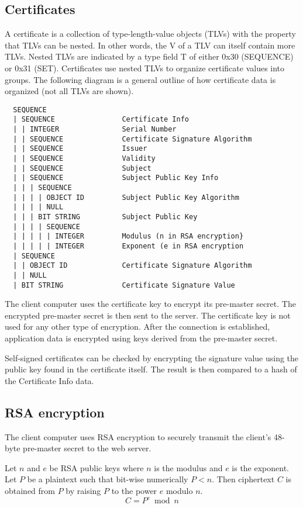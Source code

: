 \documentclass[12pt]{article}
\begin{document}
\subsection*{Certificates}

A certificate is a collection of type-length-value objects (TLVs) with the
property that TLVs can be nested.
In other words, the V of a TLV can itself contain more TLVs.
Nested TLVs are indicated by a type field T of either 0x30 (SEQUENCE)
or 0x31 (SET).
Certificates use nested TLVs to organize certificate values
into groups.
The following diagram is a general outline of how certificate data is organized
(not all TLVs are shown).

{\scriptsize
\begin{verbatim}
  SEQUENCE
  | SEQUENCE                Certificate Info
  | | INTEGER               Serial Number
  | | SEQUENCE              Certificate Signature Algorithm
  | | SEQUENCE              Issuer
  | | SEQUENCE              Validity
  | | SEQUENCE              Subject
  | | SEQUENCE              Subject Public Key Info
  | | | SEQUENCE
  | | | | OBJECT ID         Subject Public Key Algorithm
  | | | | NULL
  | | | BIT STRING          Subject Public Key
  | | | | SEQUENCE
  | | | | | INTEGER         Modulus (n in RSA encryption}
  | | | | | INTEGER         Exponent (e in RSA encryption
  | SEQUENCE
  | | OBJECT ID             Certificate Signature Algorithm
  | | NULL
  | BIT STRING              Certificate Signature Value
\end{verbatim}
}

The client computer uses the certificate key to encrypt its pre-master
secret.
The encrypted pre-master secret is then sent to the server.
The certificate key is not used for any other type of encryption.
After the connection is established, application data is encrypted using
keys derived from the pre-master secret.

\bigskip
Self-signed certificates can be checked by encrypting the signature value
using the public key found in the certificate itself.
The result is then compared to a hash of the Certificate Info data.

\subsection*{RSA encryption}

The client computer
uses RSA encryption to securely transmit the client's
48-byte pre-master secret to the web server.

\bigskip
Let $n$ and $e$ be RSA public keys where $n$ is the modulus and $e$
is the exponent.
Let $P$ be a plaintext such that bit-wise numerically $P<n$.
Then ciphertext $C$ is obtained from $P$ by raising $P$ to the
power $e$ modulo $n$.
\begin{equation*}
C=P^e\bmod n
\end{equation*}
\end{document}
